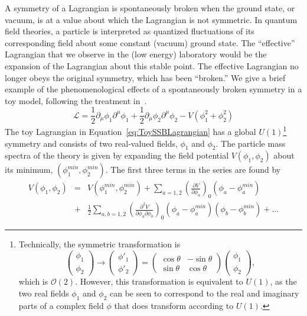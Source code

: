 A symmetry of a Lagrangian is spontaneously broken when the ground state, or
vacuum, is at a value about which the Lagrangian is not symmetric.  In
quantum field theories, a particle is interpreted as quantized fluctuations of
its corresponding field about some constant (vacuum) ground state.  The
``effective'' Lagrangian that we observe in the (low energy) laboratory would be
the expansion of the Lagrangian about this stable point.  The effective
Lagrangian no longer obeys the original symmetry, which has been ``broken.''  We
give a brief example of the phenomenological effects of a spontaneously broken
symmetry in a toy model, following the treatment in~\cite{Morii:SMandBSM}.
\begin{equation}
  \mathcal{L} = 
  \frac{1}{2}\partial_\mu\phi_1\partial^\mu\phi_1 + 
  \frac{1}{2}\partial_\mu\phi_2\partial^\mu\phi_2 -
  V(\phi_1^2 + \phi_2^2)
  \label{eq:ToySSBLagrangian}
\end{equation}
The toy Lagrangian in Equation~\ref{eq:ToySSBLagrangian} has a global
$U(1)$\footnote{Technically, the symmetric transformation is 
\begin{equation}
  \left(\begin{array}{c} \phi_1 \\ \phi_2 \end{array}\right)
    \to
  \left(\begin{array}{c} \phi'_1 \\ \phi'_2 \end{array}\right)
    =
  \left(\begin{array}{cc} \cos\theta & -\sin\theta \\ 
    \sin\theta & \cos\theta \end{array}\right)
  \left(\begin{array}{c} \phi_1 \\ \phi_2 \end{array}\right),
    \nonumber
  \end{equation} which is $\mathcal{O}(2)$.  However, this transformation is equivalent to 
$U(1)$, as the two real fields $\phi_1$ and $\phi_2$ can be seen to correspond
to the real and imaginary parts of a complex field $\phi$ that does transform
according to $U(1)$.} symmetry and consists of two real-valued fields, $\phi_1$
and $\phi_2$.  The particle mass spectra of the theory is given by expanding the
field potential $V(\phi_1, \phi_2)$ about its minimum, $(\phi^{min}_1,
\phi^{min}_2)$.  The first three terms in the series are found by
\begin{eqnarray}
  V(\phi_1, \phi_2) &= &V(\phi^{min}_1, \phi^{min}_2) + 
  \sum_{a=1,2} \left(\frac {\partial V}{\partial \phi_a}\right)_{0} (\phi_a -
  \phi^{min}_a) \nonumber \\
  &+ &\frac{1}{2} \sum_{a,b=1,2} \left(\frac {\partial^2 V}{\partial \phi_a \partial
  \phi_b}\right)_{0} (\phi_a - \phi^{min}_a)(\phi_b - \phi^{min}_b) + \ldots
  \label{eq:ExpandedPotential}
\end{eqnarray}
